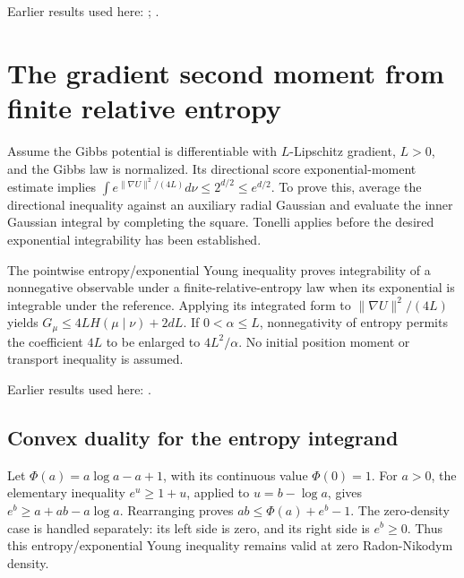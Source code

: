 \documentclass[11pt,a4paper]{report}
\begin{document}
Earlier results used here: \cite[Section~3.26.2]{LangevinLean2026ULASC}; \cite[Section~3.26.3]{LangevinLean2026ULASC}.
\section{\texorpdfstring{The gradient second moment from finite relative entropy}{The gradient second moment from finite relative entropy}}
\label{proof-module-UnadjustedLangevin-LSI-EntropyMoment-lean}


Assume the Gibbs potential is differentiable with \(L\)-Lipschitz gradient, \(L>0\), and the Gibbs law is normalized. Its directional score exponential-moment estimate implies \(\int e^{\|\nabla U\|^2/(4L)}d\nu\le2^{d/2}\le e^{d/2}\). To prove this, average the directional inequality against an auxiliary radial Gaussian and evaluate the inner Gaussian integral by completing the square. Tonelli applies before the desired exponential integrability has been established.



The pointwise entropy/\allowbreak{}exponential Young inequality proves integrability of a nonnegative observable under a finite-relative-entropy law when its exponential is integrable under the reference. Applying its integrated form to \(\|\nabla U\|^2/(4L)\) yields \(G_\mu\le4L H(\mu\mid\nu)+2dL\). If \(0<\alpha\le L\), nonnegativity of entropy permits the coefficient \(4L\) to be enlarged to \(4L^2/\alpha\). No initial position moment or transport inequality is assumed.



Earlier results used here: \cite[Section~3.27]{LangevinLean2026ULASC}.
\subsection{\texorpdfstring{Convex duality for the entropy integrand}{Convex duality for the entropy integrand}}
\label{report-step-UnadjustedLangevin-LSI-EntropyMoment-lean-1}


Let \(\Phi(a)=a\log a-a+1\), with its continuous value \(\Phi(0)=1\). For \(a>0\), the elementary inequality \(e^u\ge1+u\), applied to \(u=b-\log a\), gives \(e^b\ge a+ab-a\log a\). Rearranging proves \(ab\le\Phi(a)+e^b-1\). The zero-density case is handled separately: its left side is zero, and its right side is \(e^b\ge0\). Thus this entropy/\allowbreak{}exponential Young inequality remains valid at zero Radon-Nikodym density.
\end{document}
